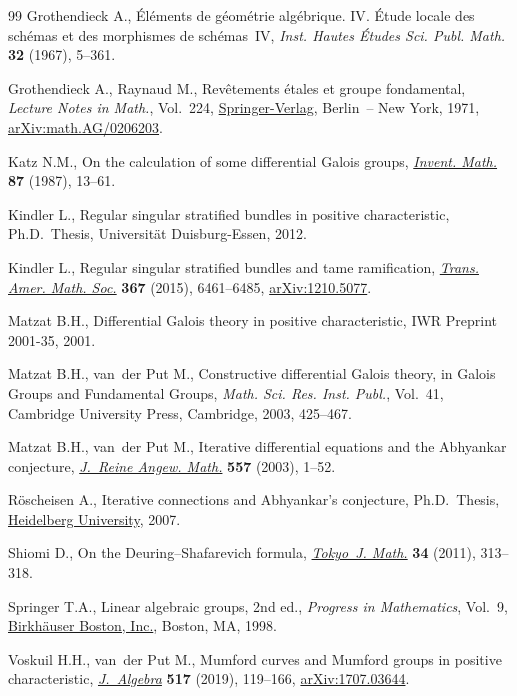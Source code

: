 \documentclass[10pt,a4paper]{amsart}
\numberwithin{equation}{section}
\begin{document}
\begin{thebibliography}{99}
Grothendieck A., \'El\'ements de g\'eom\'etrie alg\'ebrique. {IV}. \'Etude
 locale des sch\'emas et des morphismes de sch\'emas~{IV}, \textit{Inst.
 Hautes \'Etudes Sci. Publ. Math.} \textbf{32} (1967), 5--361.

Grothendieck A., Raynaud M., Rev\^etements \'etales et groupe fondamental,
 \textit{Lecture Notes in Math.}, Vol.~224, \href{http://dx.doi.org/10.1007/BFb0058656}{Springer-Verlag}, Berlin~-- New
 York, 1971, \href{https://arxiv.org/abs/math.AG/0206203}{arXiv:math.AG/0206203}.

Katz N.M., On the calculation of some differential {G}alois groups,
 \href{https://doi.org/10.1007/BF01389152}{\textit{Invent. Math.}} \textbf{87} (1987), 13--61.

Kindler L., Regular singular stratified bundles in positive characteristic,
 Ph.D.~Thesis, Universit\"at Duisburg-Essen, 2012.

Kindler L., Regular singular stratified bundles and tame ramification,
 \href{https://doi.org/10.1090/S0002-9947-2014-06143-6}{\textit{Trans. Amer. Math. Soc.}} \textbf{367} (2015), 6461--6485,
 \href{https://arxiv.org/abs/1210.5077}{arXiv:1210.5077}.

Matzat B.H., Differential {G}alois theory in positive characteristic, {IWR}
 Preprint 2001-35, 2001.

Matzat B.H., van~der Put M., Constructive differential {G}alois theory, in
 Galois Groups and Fundamental Groups, \textit{Math. Sci. Res. Inst. Publ.},
 Vol.~41, Cambridge University Press, Cambridge, 2003, 425--467.

Matzat B.H., van~der Put M., Iterative differential equations and the
 {A}bhyankar conjecture, \href{https://doi.org/10.1515/crll.2003.032}{\textit{J.~Reine Angew. Math.}} \textbf{557} (2003),
 1--52.

R\"oscheisen A., Iterative connections and {A}bhyankar's conjecture, Ph.D.~Thesis, \href{https://doi.org/10.11588/heidok.00007179}{Heidelberg University}, 2007.

Shiomi D., On the {D}euring--{S}hafarevich formula, \href{https://doi.org/10.3836/tjm/1327931387}{\textit{Tokyo~J. Math.}}
 \textbf{34} (2011), 313--318.

Springer T.A., Linear algebraic groups, 2nd ed., \textit{Progress in Mathematics},
 Vol.~9, \href{https://doi.org/10.1007/978-0-8176-4840-4}{Birkh\"{a}user Boston, Inc.}, Boston, MA, 1998.

Voskuil H.H., van~der Put M., Mumford curves and {M}umford groups in positive
 characteristic, \href{https://doi.org/10.1016/j.jalgebra.2018.09.036}{\textit{J.~Algebra}} \textbf{517} (2019), 119--166,
 \href{https://arxiv.org/abs/1707.03644}{arXiv:1707.03644}.

\end{thebibliography}
\end{document}
